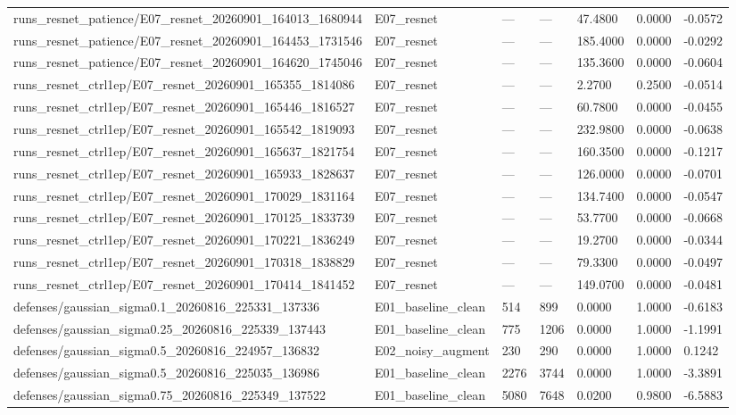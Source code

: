 \begin{tabular}{lllllll}
runs_resnet_patience/E07_resnet_20260901_164013_1680944 & E07_resnet & — & — & 47.4800 & 0.0000 & -0.0572 \\
runs_resnet_patience/E07_resnet_20260901_164453_1731546 & E07_resnet & — & — & 185.4000 & 0.0000 & -0.0292 \\
runs_resnet_patience/E07_resnet_20260901_164620_1745046 & E07_resnet & — & — & 135.3600 & 0.0000 & -0.0604 \\
runs_resnet_ctrl1ep/E07_resnet_20260901_165355_1814086 & E07_resnet & — & — & 2.2700 & 0.2500 & -0.0514 \\
runs_resnet_ctrl1ep/E07_resnet_20260901_165446_1816527 & E07_resnet & — & — & 60.7800 & 0.0000 & -0.0455 \\
runs_resnet_ctrl1ep/E07_resnet_20260901_165542_1819093 & E07_resnet & — & — & 232.9800 & 0.0000 & -0.0638 \\
runs_resnet_ctrl1ep/E07_resnet_20260901_165637_1821754 & E07_resnet & — & — & 160.3500 & 0.0000 & -0.1217 \\
runs_resnet_ctrl1ep/E07_resnet_20260901_165933_1828637 & E07_resnet & — & — & 126.0000 & 0.0000 & -0.0701 \\
runs_resnet_ctrl1ep/E07_resnet_20260901_170029_1831164 & E07_resnet & — & — & 134.7400 & 0.0000 & -0.0547 \\
runs_resnet_ctrl1ep/E07_resnet_20260901_170125_1833739 & E07_resnet & — & — & 53.7700 & 0.0000 & -0.0668 \\
runs_resnet_ctrl1ep/E07_resnet_20260901_170221_1836249 & E07_resnet & — & — & 19.2700 & 0.0000 & -0.0344 \\
runs_resnet_ctrl1ep/E07_resnet_20260901_170318_1838829 & E07_resnet & — & — & 79.3300 & 0.0000 & -0.0497 \\
runs_resnet_ctrl1ep/E07_resnet_20260901_170414_1841452 & E07_resnet & — & — & 149.0700 & 0.0000 & -0.0481 \\
defenses/gaussian_sigma0.1_20260816_225331_137336 & E01_baseline_clean & 514 & 899 & 0.0000 & 1.0000 & -0.6183 \\
defenses/gaussian_sigma0.25_20260816_225339_137443 & E01_baseline_clean & 775 & 1206 & 0.0000 & 1.0000 & -1.1991 \\
defenses/gaussian_sigma0.5_20260816_224957_136832 & E02_noisy_augment & 230 & 290 & 0.0000 & 1.0000 & 0.1242 \\
defenses/gaussian_sigma0.5_20260816_225035_136986 & E01_baseline_clean & 2276 & 3744 & 0.0000 & 1.0000 & -3.3891 \\
defenses/gaussian_sigma0.75_20260816_225349_137522 & E01_baseline_clean & 5080 & 7648 & 0.0200 & 0.9800 & -6.5883 \\

\end{tabular}
